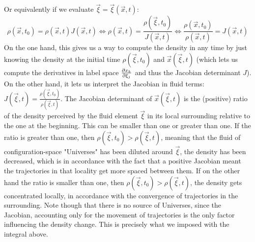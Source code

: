 \documentclass[11pt, a4paper]{article} %
\DeclareRobustCommand{\mybox}[2][gray!20]{%
\begin{tcolorbox}[   %
        left=1cm,
        right=1cm,
        top=0.5cm,
        bottom=0.5cm,
        colback=#1,
        colframe=#1,
        width=\dimexpr\textwidth\relax, 
        enlarge left by=0mm,
        boxsep=5pt,
        arc=0pt,outer arc=0pt,
        ]
        #2
\end{tcolorbox}
}
\begin{document}
\mybox{
Or equivalently if we evaluate $\vec{\xi}=\vec{\xi}(\vec{x},t)$:
\begin{equation}
\rho(\vec{x},t_0) = \rho(\vec{x},t) J(\vec{x},t)\Longleftrightarrow \rho(\vec{x},t)=\frac{\rho(\vec{\xi},t_0)}{J(\vec{x},t)}\Longleftrightarrow \frac{\rho(\vec{x},t_0)}{\rho(\vec{x},t)}=J(\vec{x},t)
\end{equation}
On the one hand, this gives us a way to compute the density in any time by just knowing the density at the initial time $\rho(\vec{\xi},t_0)$ and $\vec{x}(\vec{\xi},t)$ (which lets us compute the derivatives in label space $\pdv{x_k}{\xi_j}$ and thus the Jacobian determinant $J$). On the other hand, it lets us interpret the Jacobian in fluid terms: $J(\vec{\xi},t)=\frac{\rho(\vec{\xi},t_0)}{\rho(\vec{\xi},t)}$. The Jacobian determinant of $\vec	{x}(\vec{\xi},t)$ is the (positive) ratio of the density perceived by the fluid element $\vec{\xi}$ in its local surrounding relative to the one at the beginning. This can be smaller than one or greater than one. If the ratio is greater than one, then $\rho(\vec{\xi},t_0)>\rho(\vec{\xi},t)$, meaning that the fluid of configuration-space "Universes" has been diluted around $\vec{\xi}$, the density has been decreased, which is in accordance with the fact that a positive Jacobian meant the trajectories in that locality get more spaced between them. If on the other hand the ratio is smaller than one, then $\rho(\vec{\xi},t_0)>\rho(\vec{\xi},t)$, the density gets concentrated locally, in accordance with the convergence of trajectories in the surrounding. Note though that there is no source of Universes, since the Jacobian, accounting only for the movement of trajectories is the only factor influencing the density change. This is precisely what we imposed with the integral above.\\

}
\end{document}
